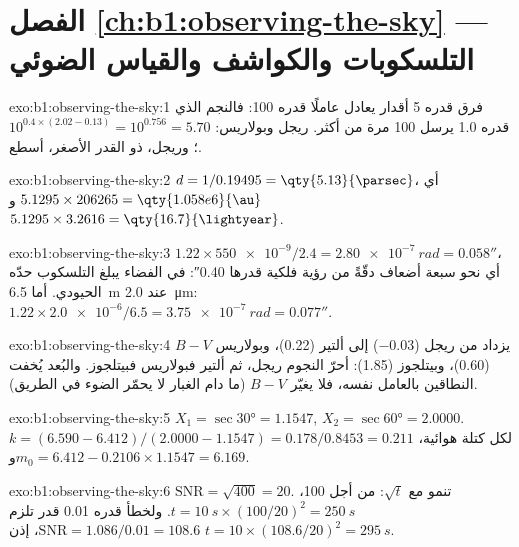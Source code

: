 \section*{الفصل \ref{ch:b1:observing-the-sky} --- التلسكوبات والكواشف والقياس الضوئي}

\begin{solution}{exo:b1:observing-the-sky:1}
فرق قدره 5 أقدار يعادل عاملًا قدره 100: فالنجم الذي قدره 1.0 يرسل 100 مرة من  أكثر. ريجل وبولاريس: $10^{0.4\times(2.02 - 0.13)} =
10^{0.756} = 5.70$؛ وريجل، ذو القدر الأصغر، أسطع.
\end{solution}

\begin{solution}{exo:b1:observing-the-sky:2}
$d = 1/0.19495 = \qty{5.13}{\parsec}$، أي $5.1295\times206265 =
\qty{1.058e6}{\au}$ و$5.1295\times3.2616 = \qty{16.7}{\lightyear}$.
\end{solution}

\begin{solution}{exo:b1:observing-the-sky:3}
$1.22\times\num{550e-9}/2.4 = \qty{2.80e-7}{rad} = \ang{;;0.058}$، أي نحو سبعة أضعاف دقّةً من رؤية فلكية قدرها \ang{;;0.40}: في الفضاء يبلغ التلسكوب حدّه الحيودي. أما \qty{6.5}{m} عند \qty{2.0}{\micro\metre}:
$1.22\times\num{2.0e-6}/6.5 = \qty{3.75e-7}{rad} = \ang{;;0.077}$.
\end{solution}

\begin{solution}{exo:b1:observing-the-sky:4}
$B - V$ يزداد من ريجل ($-0.03$) إلى ألتير (0.22)، وبولاريس (0.60)، وبيتلجوز (1.85): أحرّ النجوم ريجل، ثم ألتير فبولاريس فبيتلجوز. والبُعد يُخفت النطاقين بالعامل نفسه، فلا يغيّر $B - V$ (ما دام الغبار لا يحمّر الضوء في الطريق).
\end{solution}

\begin{solution}{exo:b1:observing-the-sky:5}
$X_1 = \sec\ang{30} = 1.1547$, $X_2 = \sec\ang{60} = 2.0000$.
$k = (6.590 - 6.412)/(2.0000 - 1.1547) = 0.178/0.8453 = \num{0.211}$ لكل كتلة هوائية، و$m_0 = 6.412 - 0.2106\times1.1547 = 6.169$.
\end{solution}

\begin{solution}{exo:b1:observing-the-sky:6}
$\mathrm{SNR} = \sqrt{400} = 20$. تنمو  مع $\sqrt t$: من أجل 100،
$t = \qty{10}{s}\times(100/20)^2 = \qty{250}{s}$. ولخطأ قدره \num{0.01}
قدر تلزم $\mathrm{SNR} = 1.086/0.01 = 108.6$، إذن
$t = 10\times(108.6/20)^2 = \qty{295}{s}$.
\end{solution}

